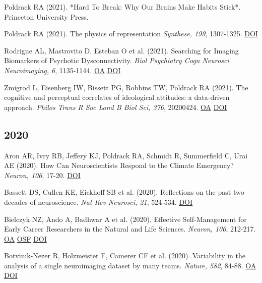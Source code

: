 \documentclass[10pt, letterpaper]{article}
\begin{document}
Poldrack RA (2021).  *Hard To Break: Why Our Brains Make Habits Stick*. Princeton University Press. \vspace{2mm}

Poldrack RA (2021). The physics of representation \textit{Synthese, 199}, 1307-1325. \href{http://dx.doi.org/10.1007/s11229-020-02793-y}{DOI} \vspace{2mm}

Rodrigue AL, Mastrovito D, Esteban O et al. (2021). Searching for Imaging Biomarkers of Psychotic Dysconnectivity. \textit{Biol Psychiatry Cogn Neurosci Neuroimaging, 6}, 1135-1144. \href{https://www.ncbi.nlm.nih.gov/pmc/articles/PMC8206251}{OA} \href{http://dx.doi.org/10.1016/j.bpsc.2020.12.002}{DOI} \vspace{2mm}

Zmigrod L, Eisenberg IW, Bissett PG, Robbins TW, Poldrack RA (2021). The cognitive and perceptual correlates of ideological attitudes: a data-driven approach. \textit{Philos Trans R Soc Lond B Biol Sci, 376}, 20200424. \href{https://www.ncbi.nlm.nih.gov/pmc/articles/PMC7935109}{OA} \href{http://dx.doi.org/10.1098/rstb.2020.0424}{DOI} \vspace{2mm}

\subsection*{2020}Aron AR, Ivry RB, Jeffery KJ, Poldrack RA, Schmidt R, Summerfield C, Urai AE (2020). How Can Neuroscientists Respond to the Climate Emergency? \textit{Neuron, 106}, 17-20. \href{http://dx.doi.org/10.1016/j.neuron.2020.02.019}{DOI} \vspace{2mm}

Bassett DS, Cullen KE, Eickhoff SB et al. (2020). Reflections on the past two decades of neuroscience. \textit{Nat Rev Neurosci, 21}, 524-534. \href{http://dx.doi.org/10.1038/s41583-020-0363-6}{DOI} \vspace{2mm}

Bielczyk NZ, Ando A, Badhwar A et al. (2020). Effective Self-Management for Early Career Researchers in the Natural and Life Sciences. \textit{Neuron, 106}, 212-217. \href{https://www.ncbi.nlm.nih.gov/pmc/articles/PMC7665085}{OA} \href{https://osf.io/w6emk/}{OSF} \href{http://dx.doi.org/10.1016/j.neuron.2020.03.015}{DOI} \vspace{2mm}

Botvinik-Nezer R, Holzmeister F, Camerer CF et al. (2020). Variability in the analysis of a single neuroimaging dataset by many teams. \textit{Nature, 582}, 84-88. \href{https://www.ncbi.nlm.nih.gov/pmc/articles/PMC7771346}{OA} \href{http://dx.doi.org/10.1038/s41586-020-2314-9}{DOI} \vspace{2mm}
\end{document}
